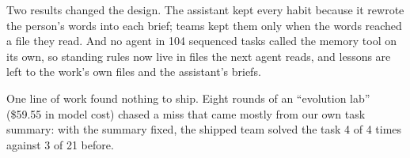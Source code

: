 Two results changed the design. The assistant kept every habit because it rewrote the person's
words into each brief; teams kept them only when the words reached a file they read. And no agent
in 104 sequenced tasks called the memory tool on its own, so standing rules now live in files the
next agent reads, and lessons are left to the work's own files and the assistant's briefs.

One line of work found nothing to ship. Eight rounds of an ``evolution lab'' (\$59.55 in model
cost) chased a miss that came mostly from our own task summary: with the summary fixed, the shipped
team solved the task 4 of 4 times against 3 of 21 before.
